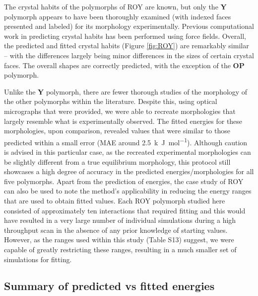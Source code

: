 \documentclass[twoside,twocolumn,9pt]{article}
\begin{document}
The crystal habits of the polymorphs of ROY are known\cite{Yu2010}, but only the \textbf{Y} polymorph appears to have been thoroughly examined (with indexed faces presented and labeled) for its morphology\cite{Borchardt1998} experimentally. Previous computational work in predicting crystal habits has been performed\cite{Coombes2008} using force fields. Overall, the predicted and fitted crystal habits (Figure \ref{fig:ROY}) are remarkably similar -- with the differences largely being minor differences in the sizes of certain crystal faces. The overall shapes are correctly predicted, with the exception of the \textbf{OP} polymorph.

Unlike the \textbf{Y} polymorph, there are fewer thorough studies of the morphology of the other polymorphs within the literature. 
Despite this, using optical micrographs that were provided,\cite{Yu2010} we were able to recreate morphologies that largely resemble what is experimentally observed. The fitted energies for these morphologies, upon comparison, revealed values that were similar to 
those predicted within a small error (MAE around \qty{2.5}{k.J.mol^{-1}}). Although caution is advised in this particular case, as the recreated experimental morphologies can be slightly different from a true equilibrium morphology, this protocol still showcases a high degree of accuracy in the predicted energies/morphologies for all five polymorphs. Apart from the prediction of energies, the case study of ROY can also be used to note the method's applicability in reducing the energy ranges that are used to obtain fitted values. Each ROY polymorph studied here consisted of approximately ten interactions that required fitting and this would have resulted in a very large number of individual simulations during a high throughput scan in the absence of any prior knowledge of starting values. However, as the ranges used within this study (Table S13) suggest, we were capable of greatly restricting these ranges, resulting in a much smaller set of simulations for fitting. 


\subsection{Summary of predicted vs fitted energies}
\end{document}
